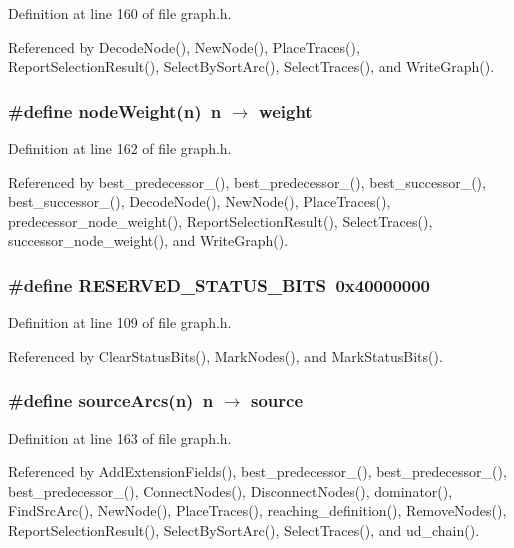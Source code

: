 Definition at line 160 of file graph.h.

Referenced by Decode\-Node(), New\-Node(), Place\-Traces(), Report\-Selection\-Result(), Select\-By\-Sort\-Arc(), Select\-Traces(), and Write\-Graph().
\subsubsection{\setlength{\rightskip}{0pt plus 5cm}\#define node\-Weight(n)~n $\rightarrow$ weight}\label{graph_8h_dea45314c0812b5187bcbb24f41acb54}




Definition at line 162 of file graph.h.

Referenced by best\_\-predecessor\_(), best\_\-predecessor\_(), best\_\-successor\_(), best\_\-successor\_(), Decode\-Node(), New\-Node(), Place\-Traces(), predecessor\_\-node\_\-weight(), Report\-Selection\-Result(), Select\-Traces(), successor\_\-node\_\-weight(), and Write\-Graph().
\subsubsection{\setlength{\rightskip}{0pt plus 5cm}\#define RESERVED\_\-STATUS\_\-BITS~0x40000000}\label{graph_8h_52d71b7a951e634e03321799f1b1ac1f}




Definition at line 109 of file graph.h.

Referenced by Clear\-Status\-Bits(), Mark\-Nodes(), and Mark\-Status\-Bits().
\subsubsection{\setlength{\rightskip}{0pt plus 5cm}\#define source\-Arcs(n)~n $\rightarrow$ source}\label{graph_8h_b8fa3b774a56f8cd04b2ce36a70e67a8}




Definition at line 163 of file graph.h.

Referenced by Add\-Extension\-Fields(), best\_\-predecessor\_(), best\_\-predecessor\_(), best\_\-predecessor\_(), Connect\-Nodes(), Disconnect\-Nodes(), dominator(), Find\-Src\-Arc(), New\-Node(), Place\-Traces(), reaching\_\-definition(), Remove\-Nodes(), Report\-Selection\-Result(), Select\-By\-Sort\-Arc(), Select\-Traces(), and ud\_\-chain().
